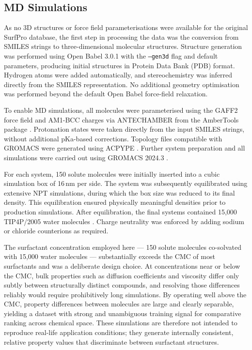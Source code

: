 \documentclass[11pt]{aime}
\begin{document}
\subsection{MD Simulations}
\label{sec:methods:molecular_dynamics}

As no 3D structures or force field parameterisations were available for the original SurfPro database, the first step in processing the data was the conversion from SMILES strings to three-dimensional molecular structures.
Structure generation was performed using Open Babel 3.0.1 \cite{oboyle_open_2011} with the {\tt --gen3d} flag and default parameters, producing initial structures in Protein Data Bank (PDB) format.
Hydrogen atoms were added automatically, and stereochemistry was inferred directly from the SMILES representation.
No additional geometry optimisation was performed beyond the default Open Babel force-field relaxation.

To enable MD simulations, all molecules were parameterised using the GAFF2 force field \cite{wang_development_2004} and AM1-BCC charges \cite{jakalian_fast_2002} via ANTECHAMBER from the AmberTools package \cite{case_ambertools_2023}.
Protonation states were taken directly from the input SMILES strings, without additional pKa-based corrections.
Topology files compatible with GROMACS were generated using ACPYPE \cite{sousa_da_silva_acpype_2012}.
Further system preparation and all simulations were carried out using GROMACS 2024.3 \cite{lindahl_gromacs_2001,abraham_gromacs_2015}.

For each system, 150 solute molecules were initially inserted into a cubic simulation box of 16\,nm per side.
The system was subsequently equilibrated using extensive NPT simulations, during which the box size was reduced to its final density.
This equilibration ensured physically meaningful densities prior to production simulations.
After equilibration, the final systems contained 15,000 TIP4P/2005 water molecules \cite{abascal_general_2005}.
Charge neutrality was enforced by adding sodium or chloride counterions as required.

The surfactant concentration employed here --- 150 solute molecules co-solvated with 15,000 water molecules --- substantially exceeds the CMC of most surfactants and was a deliberate design choice.
At concentrations near or below the CMC, bulk properties such as diffusion coefficients and viscosity differ only subtly between structurally distinct compounds, and resolving those differences reliably would require prohibitively long simulations.
By operating well above the CMC, property differences between molecules are large and clearly separable, yielding a dataset with strong and unambiguous training signal for comparative ranking across chemical space.
These simulations are therefore not intended to reproduce real-life application conditions;
they generate internally consistent, relative property values that discriminate between surfactant structures.
\end{document}
